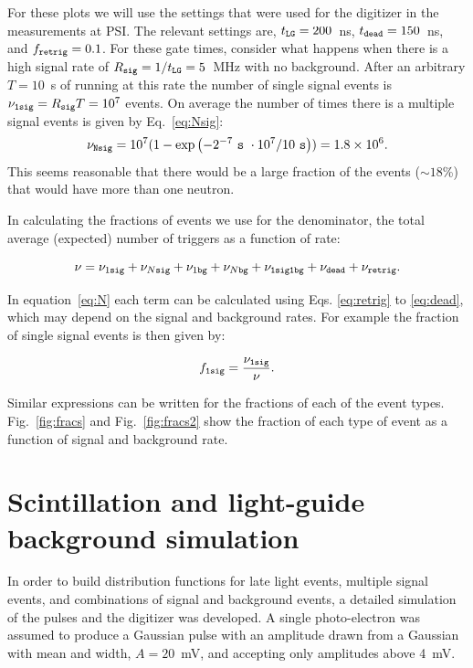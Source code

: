\documentclass[review]{elsarticle}
\begin{document}
For these plots we will use the settings that were used for the
digitizer in the measurements at PSI.  The relevant settings are,
$t_{\tt LG}=200$~ns, $t_{\tt dead}=150$~ns, and $f_{\tt retrig}=0.1$.
For these gate times, consider what happens when there is a high
signal rate of $R_{\tt sig} = 1/t_{\tt LG} = 5$~MHz with no
background.  After an arbitrary $T=10$~s of running at this rate the
number of single signal events is $\nu_{\tt 1 sig} = R_{\tt sig} T =
10^7$ events.  On average the number of times there is a multiple
signal events is given by Eq.~\ref{eq:Nsig}:
\begin{equation}
\nu_{\tt N sig} = 10^7 ( 1 - \exp{ \left( -2^{-7}\ {\tt s}\ \cdot 10^7  / 10\ {\tt s} \right) } ) = 1.8\times10^6. 
\end{equation}
This seems reasonable that there would be a large fraction of the
events ($\sim 18$\%) that would have more than one neutron.

In calculating the fractions of events we use for the denominator, the
total average (expected) number of triggers as a function of rate:

\begin{equation}\label{eq:N}
\nu = \nu_{1\tt sig} + \nu_{N\tt sig} + \nu_{1\tt bg} + \nu_{N\tt bg} + \nu_{\tt 1 sig 1 bg} + \nu_{\tt dead} + \nu_{\tt retrig}.
\end{equation}

In equation~\ref{eq:N} each term can be calculated using
Eqs. \ref{eq:retrig} to \ref{eq:dead}, which may depend on the signal
and background rates.  For example the fraction of single signal
events is then given by:

\begin{equation}
f_{\tt 1 sig } = \frac{ \nu_{\tt 1 sig} }{ \nu }.
\end{equation}

Similar expressions can be written for the fractions of each of the
event types.  Fig.~\ref{fig:fracs} and Fig.~\ref{fig:fracs2} show the
fraction of each type of event as a function of signal and background
rate.


\section{ Scintillation and light-guide background simulation }\label{sec:sim}

In order to build distribution functions for late light events,
multiple signal events, and combinations of signal and background
events, a detailed simulation of the pulses and the digitizer was
developed.  A single photo-electron was assumed to produce a Gaussian
pulse with an amplitude drawn from a Gaussian with mean and width,
$A=20$~mV, and accepting only amplitudes above 4~mV.
\end{document}
